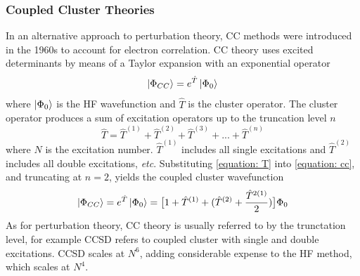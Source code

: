 \subsubsection{Coupled Cluster Theories}
In an alternative approach to perturbation theory, \ac{CC} methods were introduced in the 1960s to account for electron correlation.\cite{Cizek1966,Paldus1972} \ac{CC} theory uses excited determinants by means of a Taylor expansion with an exponential operator
\begin{equation}\label{equation: cc}
    \ket{\Phi_{CC}}=e^{\hat{T}}\ket{\Phi_{0}}
\end{equation}
where $\ket{\Phi_{0}}$ is the \ac{HF} wavefunction and $\hat{T}$ is the cluster operator. The cluster operator produces a sum of excitation operators up to the truncation level $n$
\begin{equation}\label{equation: T}
    \hat{T}=\hat{T}^{(1)}+\hat{T}^{(2)}+\hat{T}^{(3)}+...+\hat{T}^{(n)}
\end{equation}
where $N$ is the excitation number. $\hat{T}^{(1)}$ includes all single excitations and $\hat{T}^{(2)}$ includes all double excitations, \textit{etc}.
Substituting \ref{equation: T} into \ref{equation: cc}, and truncating at $n=2$, yields the coupled cluster wavefunction
\begin{equation}\label{equation: CCwavefunctioncomplete}
\ket{\Phi_{CC}}=e^{\hat{T}}\ket{\Phi_{0}}=\big[1+\hat{T}^{(1)}+(\hat{T}^{(2)}+\frac{\hat{T}^{2(1)}}{2})\big]\Phi_{0}
\end{equation}
As for perturbation theory, \ac{CC} theory is usually referred to by the trunctation level, for example CCSD refers to coupled cluster with single and double excitations. CCSD scales at $N^{6}$, adding considerable expense to the \ac{HF} method, which scales at $N^{4}$.

